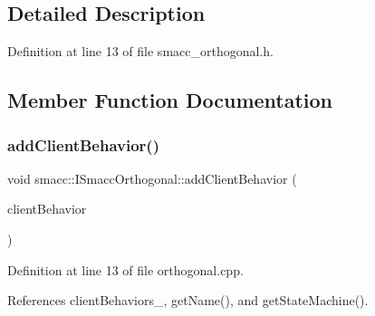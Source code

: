 \subsection{Detailed Description}


Definition at line 13 of file smacc\+\_\+orthogonal.\+h.



\subsection{Member Function Documentation}
\mbox{\label{classsmacc_1_1ISmaccOrthogonal_a55097443978ca7955d909df4f5f2c04e}} 
\subsubsection{\texorpdfstring{add\+Client\+Behavior()}{addClientBehavior()}}
{\footnotesize\ttfamily void smacc\+::\+I\+Smacc\+Orthogonal\+::add\+Client\+Behavior (\begin{DoxyParamCaption}\item[{std\+::shared\+\_\+ptr$<$ \hyperlink{classsmacc_1_1SmaccClientBehavior}{smacc\+::\+Smacc\+Client\+Behavior} $>$}]{client\+Behavior }\end{DoxyParamCaption})}



Definition at line 13 of file orthogonal.\+cpp.



References client\+Behaviors\+\_\+, get\+Name(), and get\+State\+Machine().


